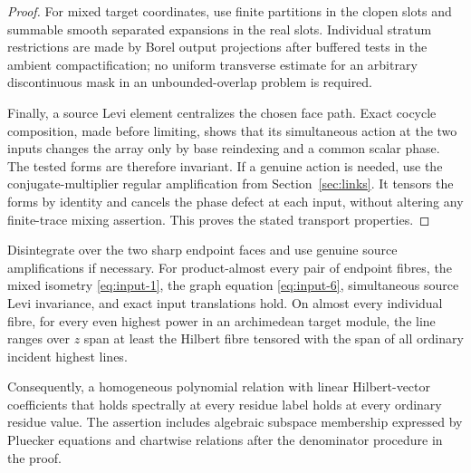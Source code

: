 \begin{proof}
For mixed target coordinates, use finite partitions in the clopen
slots and summable smooth separated expansions in the real slots.
Individual stratum restrictions are made by Borel output projections
after buffered tests in the ambient compactification; no uniform
transverse estimate for an arbitrary discontinuous mask in an
unbounded-overlap problem is required.

Finally, a source Levi element centralizes the chosen face path.
Exact cocycle composition, made before limiting, shows that its
simultaneous action at the two inputs changes the array only by base
reindexing and a common scalar phase. The tested forms are therefore
invariant. If a genuine action is needed, use the conjugate-multiplier
regular amplification from Section~\ref{sec:links}. It tensors the
forms by identity and cancels the phase defect at each input, without
altering any finite-trace mixing assertion. This proves the stated
transport properties.
\end{proof}

\begin{corollary}
\label{cor:transfer-fibre-links}
Disintegrate over the two sharp endpoint faces and use genuine source
amplifications if necessary. For product-almost every pair of endpoint
fibres, the mixed isometry \eqref{eq:input-1}, the graph equation
\eqref{eq:input-6}, simultaneous source Levi invariance, and exact
input translations hold. On almost every individual fibre, for every
even highest power in an archimedean target module, the line ranges
over $z$ span at least the Hilbert fibre tensored with the span of all
ordinary incident highest lines.

Consequently, a homogeneous polynomial relation with linear
Hilbert-vector coefficients that holds spectrally at every residue
label holds at every ordinary residue value. The assertion includes
algebraic subspace membership expressed by Pluecker equations and
chartwise relations after the denominator procedure in the proof.
\end{corollary}

